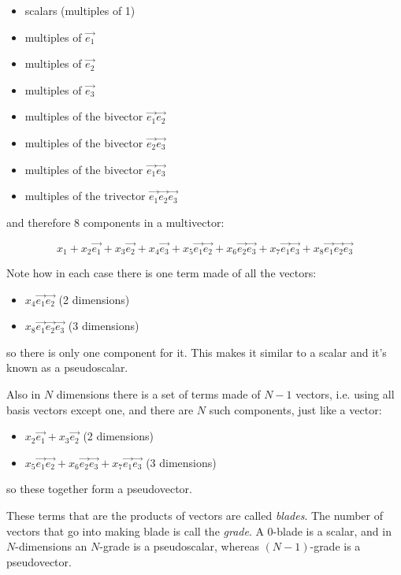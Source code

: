 \begin{itemize}    
    \item scalars (multiples of 1)
    \item multiples of $\vec{e_1}$
    \item multiples of $\vec{e_2}$
    \item multiples of $\vec{e_3}$
    \item multiples of the bivector $\vec{e_1}\vec{e_2}$
    \item multiples of the bivector $\vec{e_2}\vec{e_3}$
    \item multiples of the bivector $\vec{e_1}\vec{e_3}$
    \item multiples of the trivector $\vec{e_1}\vec{e_2}\vec{e_3}$
\end{itemize}

and therefore 8 components in a multivector:

$$
x_1 + x_2\vec{e_1} + x_3\vec{e_2} + x_4\vec{e_3}
+ x_5\vec{e_1}\vec{e_2}
+ x_6\vec{e_2}\vec{e_3}
+ x_7\vec{e_1}\vec{e_3}
+ x_8\vec{e_1}\vec{e_2}\vec{e_3}
$$

Note how in each case there is one term made of all the vectors:

\begin{itemize} 
    \item $x_4\vec{e_1}\vec{e_2}$ (2 dimensions)
    \item $x_8\vec{e_1}\vec{e_2}\vec{e_3}$ (3 dimensions)
\end{itemize}

so there is only one component for it. This makes it similar to a scalar and it's known as a pseudoscalar.

Also in $N$ dimensions there is a set of terms made of $N-1$ vectors, i.e. using all basis vectors except one, and there are $N$ such components, just like a vector:

\begin{itemize}
    \item $x_2\vec{e_1} + x_3\vec{e_2}$ (2 dimensions)
    \item $x_5\vec{e_1}\vec{e_2} + x_6\vec{e_2}\vec{e_3} + x_7\vec{e_1}\vec{e_3}$ (3 dimensions)
\end{itemize}

so these together form a pseudovector.

These terms that are the products of vectors are called \textit{blades}. The number of vectors that go into making blade is call the \textit{grade}. A 0-blade is a scalar, and in $N$-dimensions an $N$-grade is a pseudoscalar, whereas $(N-1)$-grade is a pseudovector.


